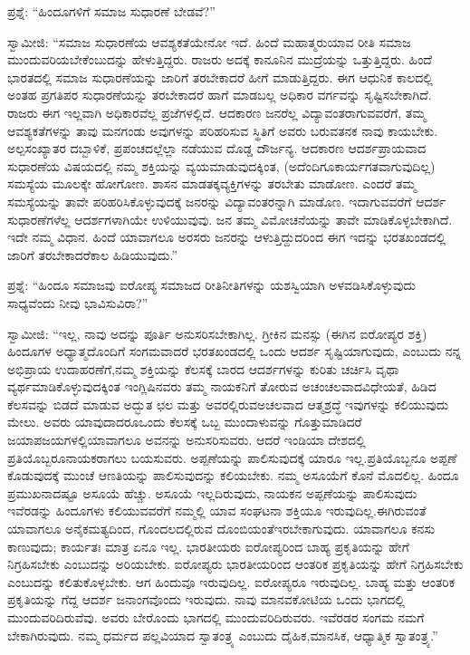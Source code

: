 \eject

ಪ್ರಶ್ನೆ: “ಹಿಂದೂಗಳಿಗೆ ಸಮಾಜ ಸುಧಾರಣೆ ಬೇಡವೆ?”

ಸ್ವಾಮೀಜಿ: “ಸಮಾಜ ಸುಧಾರಣೆಯ ಆವಶ್ಯಕತೆಯೇನೋ ಇದೆ. ಹಿಂದೆ ಮಹಾತ್ಮರು\break ಯಾವ ರೀತಿ ಸಮಾಜ ಮುಂದುವರಿಯಬೇಕೆಂಬುದನ್ನು ಹೇಳುತ್ತಿದ್ದರು. ರಾಜರು ಅದಕ್ಕೆ ಕಾನೂನಿನ ಮುದ್ರೆಯನ್ನು ಒತ್ತುತ್ತಿದ್ದರು. ಹಿಂದೆ ಭಾರತದಲ್ಲಿ ಸಮಾಜ ಸುಧಾರಣೆಯನ್ನು ಜಾರಿಗೆ ತರಬೇಕಾದರೆ ಹೀಗೆ ಮಾಡುತ್ತಿದ್ದರು. ಈಗ ಆಧುನಿಕ ಕಾಲದಲ್ಲಿ ಅಂತಹ ಪ್ರಗತಿಪರ ಸುಧಾರಣೆಯನ್ನು ತರಬೇಕಾದರೆ ಹಾಗೆ ಮಾಡಬಲ್ಲ ಅಧಿಕಾರ ವರ್ಗವನ್ನು ಸೃಷ್ಟಿಸಬೇಕಾಗಿದೆ. ರಾಜರು ಈಗ ಇಲ್ಲವಾಗಿ ಅಧಿಕಾರವೆಲ್ಲ ಪ್ರಜೆಗಳಲ್ಲಿದೆ. ಆದಕಾರಣ ಜನರೆಲ್ಲ ವಿದ್ಯಾವಂತರಾಗುವವರೆಗೆ, ತಮ್ಮ ಆವಶ್ಯಕತೆಗಳನ್ನು ತಾವು ಮನಗಂಡು ಅವುಗಳನ್ನು ಪರಿಹರಿಸುವ ಸ್ಥಿತಿಗೆ ಅವರು ಬರುವತನಕ ನಾವು ಕಾಯಬೇಕು. ಅಲ್ಪಸಂಖ್ಯಾತರ ದಬ್ಬಾಳಿಕೆ, ಪ್ರಪಂಚದಲ್ಲೆಲ್ಲಾ ನಡೆಯುವ ದೊಡ್ಡ ದೌರ್ಜನ್ಯ. ಆದಕಾರಣ ಆದರ್ಶಪ್ರಾಯವಾದ ಸುಧಾರಣೆಯ ವಿಷಯದಲ್ಲಿ ನಮ್ಮ ಶಕ್ತಿಯನ್ನು ವ್ಯಯಮಾಡುವುದಕ್ಕಿಂತ, (ಅದೆಂದಿಗೂ\break ಕಾರ್ಯಗತವಾಗುವುದಿಲ್ಲ) ಸಮಸ್ಯೆಯ ಮೂಲಕ್ಕೇ ಹೋಗೋಣ. ಶಾಸನ ಮಾಡತಕ್ಕ\break ವ್ಯಕ್ತಿಗಳನ್ನು ತರಬೇತು ಮಾಡೋಣ. ಎಂದರೆ ತಮ್ಮ ಸಮಸ್ಯೆಯನ್ನು ತಾವೇ ಪರಿಹರಿಸಿಕೊಳ್ಳುವುದಕ್ಕೆ ಜನರನ್ನು ವಿದ್ಯಾವಂತರನ್ನಾಗಿ ಮಾಡೊಣ. ಇದಾಗುವವರೆಗೆ ಆದರ್ಶ ಸುಧಾರಣೆಗಳೆಲ್ಲ ಆದರ್ಶಗಳಾಗಿಯೇ ಉಳಿಯುವುವು. ಜನ ತಮ್ಮ ವಿಮೋಚನೆಯನ್ನು ತಾವೇ ಮಾಡಿಕೊಳ್ಳಬೇಕಾಗಿದೆ. ಇದೇ ನಮ್ಮ ವಿಧಾನ. ಹಿಂದೆ ಯಾವಾಗಲೂ ಅರಸರು ಜನರನ್ನು ಆಳುತ್ತಿದ್ದುದರಿಂದ ಈಗ ಇದನ್ನು ಭರತಖಂಡದಲ್ಲಿ ಜಾರಿಗೆ ತರಬೇಕಾದರೆ\break ಕಾಲ ಹಿಡಿಯುವುದು.”

\vskip 4pt

ಪ್ರಶ್ನೆ: “ಹಿಂದೂ ಸಮಾಜವು ಐರೋಪ್ಯ ಸಮಾಜದ ರೀತಿನೀತಿಗಳನ್ನು ಯಶಸ್ವಿಯಾಗಿ ಅಳವಡಿಸಿಕೊಳ್ಳುವುದು ಸಾಧ್ಯವೆಂದು ನೀವು ಭಾವಿಸುವಿರಾ?”

\vskip 4pt

ಸ್ವಾಮೀಜಿ: “ಇಲ್ಲ, ನಾವು ಅದನ್ನು ಪೂರ್ತಿ ಅನುಸರಿಸಬೇಕಾಗಿಲ್ಲ. ಗ್ರೀಕಿನ ಮನಸ್ಸು (ಈಗಿನ ಐರೋಪ್ಯರ ಶಕ್ತಿ) ಹಿಂದೂಗಳ ಅಧ್ಯಾತ್ಮದೊಂದಿಗೆ ಸಂಗಮವಾದರೆ ಭರತಖಂಡದಲ್ಲಿ ಒಂದು ಆದರ್ಶ ಸೃಷ್ಟಿಯಾಗುವುದು, ಎಂಬುದು ನನ್ನ ಅಭಿಪ್ರಾಯ ಉದಾಹರಣೆಗೆ,\break ನಮ್ಮ ಶಕ್ತಿಯನ್ನು ಕೆಲಸಕ್ಕೆ ಬಾರದ ಆದರ್ಶಗಳನ್ನು ಕುರಿತು ಚರ್ಚಿಸಿ ವೃಥಾ ವ್ಯರ್ಥಮಾಡಿ\-ಕೊಳ್ಳುವುದಕ್ಕಿಂತ ಇಂಗ್ಲಿಷಿನವರು ತಮ್ಮ ನಾಯಕನಿಗೆ ತೋರುವ ಅಚಂಚಲವಾದ\break ವಿಧೇಯತೆ, ಹಿಡಿದ ಕೆಲಸವನ್ನು ಬಿಡದೆ ಮಾಡುವ ಅದ್ಭುತ ಛಲ ಮತ್ತು ಅವರಲ್ಲಿರುವ\break ಅಚಲವಾದ ಆತ್ಮಶ್ರದ್ಧೆ ಇವುಗಳನ್ನು ಕಲಿಯುವುದು ಮೇಲು. ಅವರು ಯಾವುದಾದರೂ\break ಒಂದು ಕೆಲಸಕ್ಕೆ ಒಬ್ಬ ಮುಂದಾಳುವನ್ನು ಗೊತ್ತುಮಾಡಿದರೆ ಜಯಾಪಜಯಗಳಲ್ಲಿ\break ಯಾವಾಗಲೂ ಅವನನ್ನು ಅನುಸರಿಸುವರು. ಆದರೆ ಇಂಡಿಯಾ ದೇಶದಲ್ಲಿ ಪ್ರತಿಯೊಬ್ಬರೂ\break ನಾಯಕರಾಗಲು ಬಯಸುವರು. ಅಪ್ಪಣೆಯನ್ನು ಪಾಲಿಸುವುದಕ್ಕೆ ಯಾರೂ ಇಲ್ಲ.\break ಪ್ರತಿಯೊಬ್ಬನೂ ಅಪ್ಪಣೆ ಕೊಡುವುದಕ್ಕೆ ಮುಂಚೆ ಆಣತಿಯನ್ನು ಪಾಲಿಸುವುದನ್ನು ಕಲಿಯಬೇಕು. ನಮ್ಮ ಅಸೂಯೆಗೆ ಕೊನೆ ಮೊದಲಿಲ್ಲ. ಹಿಂದೂ ಪ್ರಮುಖನಾದಷ್ಟೂ ಅಸೂಯೆ ಹೆಚ್ಚು. ಅಸೂಯೆ ಇಲ್ಲದಿರುವುದು, ನಾಯಕನ ಅಪ್ಪಣೆಯನ್ನು ಪಾಲಿಸುವುದು ಇವೆರಡನ್ನು ಹಿಂದೂಗಳು ಕಲಿಯುವವರೆಗೆ ನಮ್ಮಲ್ಲಿ ಯಾವ ಸಂಘಟನಾ ಶಕ್ತಿಯೂ ಇರುವುದಿಲ್ಲ.\break ಈಗಿರುವಂತೆ ಯಾವಾಗಲೂ ಅನೈಕಮತ್ಯದಿಂದ, ಗೊಂದಲದಲ್ಲಿರುವ ದೊಂಬಿಯಂತೆ\break ಇರಬೇಕಾಗುವುದು. ಯಾವಾಗಲೂ ಕನಸು ಕಾಣುವುದು; ಕಾರ್ಯತಃ ಮಾತ್ರ ಏನೂ ಇಲ್ಲ. ಭಾರತೀಯರು ಐರೋಪ್ಯರಿಂದ ಬಾಹ್ಯ ಪ್ರಕೃತಿಯನ್ನು ಹೇಗೆ ನಿಗ್ರಹಿಸಬೇಕು ಎಂಬುದನ್ನು ಅರಿಯಬೇಕು. ಐರೋಪ್ಯರು ಭಾರತೀಯರಿಂದ ಆಂತರಿಕ ಪ್ರಕೃತಿಯನ್ನು ಹೇಗೆ ನಿಗ್ರಹಿಸಬೇಕು ಎಂಬುದನ್ನು ಕಲಿತುಕೊಳ್ಳಬೇಕು. ಆಗ ಹಿಂದುವೂ ಇರುವುದಿಲ್ಲ. ಐರೋಪ್ಯರೂ ಇರುವುದಿಲ್ಲ. ಬಾಹ್ಯ ಮತ್ತು ಆಂತರಿಕ ಪ್ರಕೃತಿಯನ್ನು ಗೆದ್ದ ಆದರ್ಶ ಜನಾಂಗವೊಂದು ಇರುವುದು. ನಾವು ಮಾನವಕೋಟಿಯ ಒಂದು ಭಾಗದಲ್ಲಿ ಮುಂದುವರಿದಿರುವೆವು. ಅವರು ಬೇರೊಂದು ಭಾಗದಲ್ಲಿ ಮುಂದುವರಿದಿರುವರು. ಇವೆರಡರ ಸಂಗಮ ನಮಗೆ ಬೇಕಾಗಿರುವುದು. ನಮ್ಮ ಧರ್ಮದ ಪಲ್ಲವಿಯಾದ ಸ್ವಾತಂತ್ರ್ಯ ಎಂಬುದು ದೈಹಿಕ,\break ಮಾನಸಿಕ, ಆಧ್ಯಾತ್ಮಿಕ ಸ್ವಾತಂತ್ರ್ಯ.”

